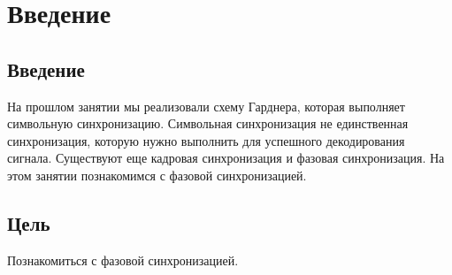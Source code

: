 \chapter{Введение}
\label{ch:intro}

\section{Введение} 

На прошлом занятии мы реализовали схему Гарднера, которая выполняет символьную синхронизацию. Символьная синхронизация не единственная синхронизация,
которую нужно выполнить для успешного декодирования сигнала. Существуют еще кадровая синхронизация и фазовая синхронизация. На этом занятии
познакомимся с фазовой синхронизацией. 

\section{Цель} 

Познакомиться с фазовой синхронизацией.
\endinput